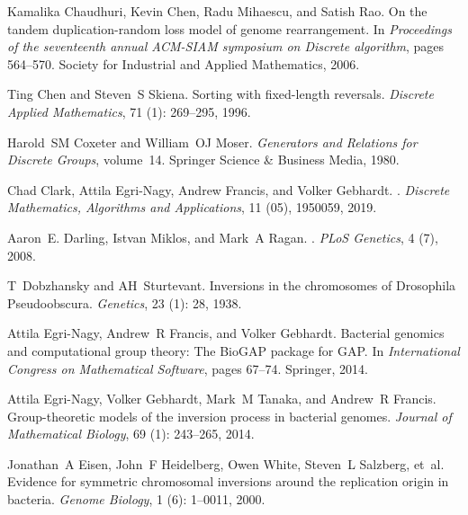 \documentclass[utf8]{Frontiers_LaTex_Templates/frontiersFPHY} %
\numberwithin{equation}{section}
\begin{document}
\begin{thebibliography}{38}
Kamalika Chaudhuri, Kevin Chen, Radu Mihaescu, and Satish Rao.
\newblock On the tandem duplication-random loss model of genome rearrangement.
\newblock In \emph{Proceedings of the seventeenth annual ACM-SIAM symposium on
  Discrete algorithm}, pages 564--570. Society for Industrial and Applied
  Mathematics, 2006.

Ting Chen and Steven~S Skiena.
\newblock Sorting with fixed-length reversals.
\newblock \emph{Discrete Applied Mathematics}, 71 (1):
  269--295, 1996.

Harold~SM Coxeter and William~OJ Moser.
\newblock \emph{Generators and Relations for Discrete Groups}, volume~14.
\newblock Springer Science \& Business Media, 1980.

Chad Clark, Attila  Egri-Nagy, Andrew Francis, and Volker Gebhardt.
. 
\newblock \emph{Discrete Mathematics, Algorithms and Applications}, 11 (05), 1950059, 2019.

Aaron~E. Darling, Istvan Miklos, and Mark~A Ragan.
.
\newblock \emph{PLoS Genetics}, 4 (7), 2008.

T~Dobzhansky and AH~Sturtevant.
\newblock Inversions in the chromosomes of {D}rosophila {P}seudoobscura.
\newblock \emph{Genetics}, 23 (1): 28, 1938.

Attila Egri-Nagy, Andrew~R Francis, and Volker Gebhardt.
\newblock Bacterial genomics and computational group theory: The {BioGAP}
  package for {GAP}.
\newblock In \emph{International Congress on Mathematical Software}, pages
  67--74. Springer, 2014{}.

Attila Egri-Nagy, Volker Gebhardt, Mark~M Tanaka, and Andrew~R Francis.
\newblock Group-theoretic models of the inversion process in bacterial genomes.
\newblock \emph{Journal of Mathematical Biology}, 69 (1):
  243--265, 2014{}.

Jonathan~A Eisen, John~F Heidelberg, Owen White, Steven~L Salzberg, et~al.
\newblock Evidence for symmetric chromosomal inversions around the replication
  origin in bacteria.
\newblock \emph{Genome Biology}, 1 (6): 1--0011, 2000.


\end{thebibliography}
\end{document}
